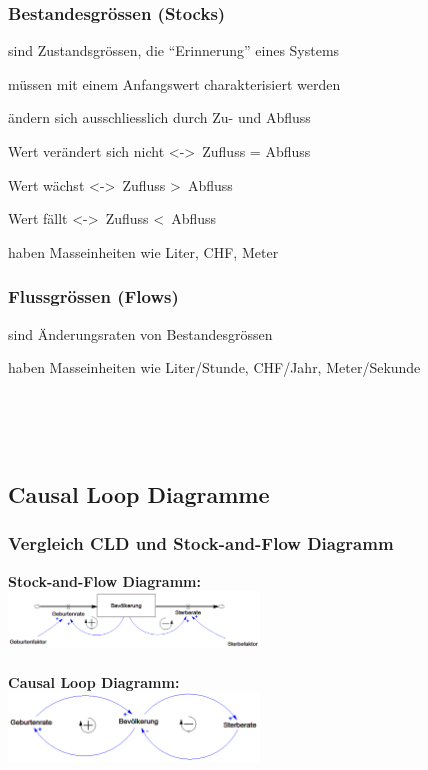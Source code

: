 \begin{multicols}{2}
	\subsubsection{Bestandesgrössen (Stocks)}
	\begin{compactitem}
		\item sind Zustandsgrössen, die “Erinnerung” eines Systems
		\item müssen mit einem Anfangswert charakterisiert werden
		\item ändern sich ausschliesslich durch Zu- und Abfluss
		\item Wert verändert sich nicht \textless-\textgreater\ Zufluss = Abfluss
		\item Wert wächst \textless-\textgreater\ Zufluss \textgreater\ Abfluss
		\item Wert fällt \textless-\textgreater\ Zufluss \textless\ Abfluss
		\item haben Masseinheiten wie Liter, CHF, Meter
	\end{compactitem}
	
	\subsubsection{Flussgrössen (Flows)}
	\begin{compactitem}
		\item sind Änderungsraten von Bestandesgrössen
		\item haben Masseinheiten wie Liter/Stunde, CHF/Jahr, Meter/Sekunde
	\end{compactitem} \ \\ \ \\ \ \\
\end{multicols}

\subsection{Causal Loop Diagramme}
\subsubsection{Vergleich CLD und Stock-and-Flow Diagramm}
\begin{multicols}{2}
	\textbf{Stock-and-Flow Diagramm:} \\
	\includegraphics[width=0.5\textwidth]{pictures/vergleich_stock} \\ \\
	\textbf{Causal Loop Diagramm:} \\
	\includegraphics[width=0.5\textwidth]{pictures/vergleich_cld} 
\end{multicols}	

